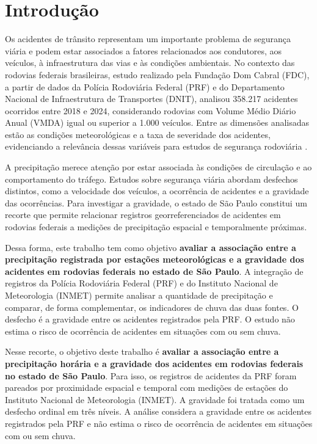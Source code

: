 \documentclass[12pt]{article}
\begin{document}
\section{Introdução}

Os acidentes de trânsito representam um importante problema de segurança viária e podem estar associados a fatores relacionados aos condutores, aos veículos, à infraestrutura das vias e às condições ambientais. No contexto das rodovias federais brasileiras, estudo realizado pela Fundação Dom Cabral (FDC), a partir de dados da Polícia Rodoviária Federal (PRF) e do Departamento Nacional de Infraestrutura de Transportes (DNIT), analisou 358.217 acidentes ocorridos entre 2018 e 2024, considerando rodovias com Volume Médio Diário Anual (VMDA) igual ou superior a 1.000 veículos. Entre as dimensões analisadas estão as condições meteorológicas e a taxa de severidade dos acidentes, evidenciando a relevância dessas variáveis para estudos de segurança rodoviária \cite{fdc2025}.

A precipitação merece atenção por estar associada às condições de circulação e ao
comportamento do tráfego. Estudos sobre segurança viária abordam desfechos distintos,
como a velocidade dos veículos, a ocorrência de acidentes e a gravidade das ocorrências.
Para investigar a gravidade, o estado de São Paulo constitui um recorte que permite
relacionar registros georreferenciados de acidentes em rodovias federais a medições de
precipitação espacial e temporalmente próximas.

Dessa forma, este trabalho tem como objetivo \textbf{avaliar a associação entre a
precipitação registrada por estações meteorológicas e a gravidade dos acidentes em
rodovias federais no estado de São Paulo}. A integração de registros da Polícia
Rodoviária Federal (PRF) e do Instituto Nacional de Meteorologia (INMET) permite
analisar a quantidade de precipitação e comparar, de forma complementar, os
indicadores de chuva das duas fontes. O desfecho é a gravidade entre os acidentes
registrados pela PRF. O estudo não estima o risco de ocorrência de acidentes em
situações com ou sem chuva.

Nesse recorte, o objetivo deste trabalho é \textbf{avaliar a associação entre a precipitação horária e a gravidade dos acidentes em rodovias federais no estado de São Paulo}. Para isso, os registros de acidentes da PRF foram pareados por proximidade espacial e temporal com medições de estações do Instituto Nacional de Meteorologia (INMET). A gravidade foi tratada como um desfecho ordinal em três níveis. A análise considera a gravidade entre os acidentes registrados pela PRF e não estima o risco de ocorrência de acidentes em situações com ou sem chuva.
\end{document}
